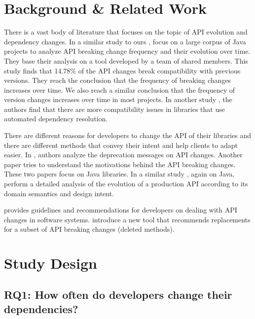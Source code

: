 \documentclass[conference]{IEEEtran}
\begin{document}
\section{Background \& Related Work}
There is a vast body of literature that focuses on the topic of API evolution and dependency changes. In a similar study to ours \cite{hist-brito}, \citeauthor{hist-brito} focus on a large corpus of Java projects to analyze API breaking change frequency and their evolution over time. They base their analysis on a tool \cite{apidiff} developed by a team of shared members. This study \cite{hist-brito} finds that 14.78\% of the API changes break compatibility with previous versions. They reach the conclusion that the frequency of breaking changes increases over time. We also reach a similar conclusion that the frequency of version changes increases over time in most projects. In another study \cite{jensjavabreak}, the authors find that there are more compatibility issues in libraries that use automated dependency resolution.

There are different reasons for developers to change the API of their libraries and there are different methods that convey their intent and help clients to adapt easier. In \cite{brito2016developers}, authors analyze the deprecation messages on API changes. Another paper \cite{brito2020you} tries to understand the motivations behind the API breaking changes. These two papers focus on Java libraries. In a similar study \cite{intent-api}, again on Java, \citeauthor{intent-api} perform a detailed analysis of the evolution of a production API according to its domain semantics and design intent.

\citeauthor{cox2019surviving} \cite{cox2019surviving} provides guidelines and recommendations for developers on dealing with API changes in software systems. \citeauthor{semdiff} \cite{semdiff} introduce a new tool that recommends replacements for a subset of API breaking changes (deleted methods). 



\section{Study Design}


\subsection{RQ1: How often do developers change their dependencies?}
\end{document}
